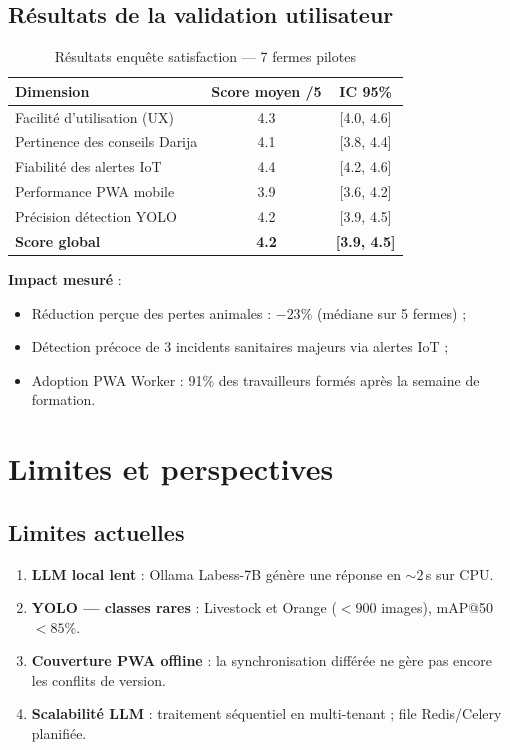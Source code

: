 \documentclass[12pt,a4paper,twoside]{report}
\begin{document}
\subsection{Résultats de la validation utilisateur}

\begin{table}[H]
\centering
\caption{Résultats enquête satisfaction — 7 fermes pilotes}
\label{tab:satisfaction}
\begin{tabular}{lcc}
\toprule
\textbf{Dimension} & \textbf{Score moyen /5} & \textbf{IC 95\%} \\
\midrule
Facilité d'utilisation (UX)   & 4.3 & [4.0, 4.6] \\
Pertinence des conseils Darija & 4.1 & [3.8, 4.4] \\
Fiabilité des alertes IoT     & 4.4 & [4.2, 4.6] \\
Performance PWA mobile        & 3.9 & [3.6, 4.2] \\
Précision détection YOLO      & 4.2 & [3.9, 4.5] \\
\midrule
\textbf{Score global}         & \textbf{4.2} & \textbf{[3.9, 4.5]} \\
\bottomrule
\end{tabular}
\end{table}

\textbf{Impact mesuré} :
\begin{itemize}
  \item Réduction perçue des pertes animales : $-23\%$ (médiane sur 5 fermes) ;
  \item Détection précoce de 3 incidents sanitaires majeurs via alertes IoT ;
  \item Adoption PWA Worker : 91\% des travailleurs formés après la semaine de formation.
\end{itemize}

\section{Limites et perspectives}

\subsection{Limites actuelles}

\begin{enumerate}
  \item \textbf{LLM local lent} : Ollama Labess-7B génère une réponse en $\sim 2$\,s sur CPU.
  \item \textbf{YOLO — classes rares} : Livestock et Orange ($< 900$ images), mAP@50 $< 85\%$.
  \item \textbf{Couverture PWA offline} : la synchronisation différée ne gère pas encore les conflits de version.
  \item \textbf{Scalabilité LLM} : traitement séquentiel en multi-tenant ; file Redis/Celery planifiée.
\end{enumerate}
\end{document}
